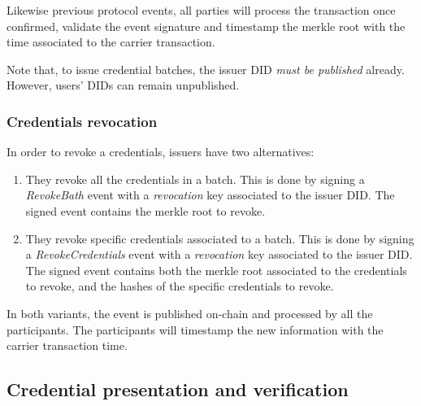 \documentclass[10pt,a4paper]{article}
\begin{document}
Likewise previous protocol events, all parties will process the transaction once confirmed, validate the event signature and timestamp the merkle root with the time associated to the carrier transaction.

Note that, to issue credential batches, the issuer DID \emph{must be published} already. However, users' DIDs can remain unpublished.

\subsubsection{Credentials revocation}

In order to revoke a credentials, issuers have two alternatives:
\begin{enumerate}
\item They revoke all the credentials in a batch.
      This is done by signing a \emph{RevokeBath} event with a \emph{revocation} key associated to the issuer DID.
      The signed event contains the merkle root to revoke.
\item They revoke specific credentials associated to a batch.
      This is done by signing a \emph{RevokeCredentials} event with a \emph{revocation} key associated to the issuer DID. 
      The signed event contains both the merkle root associated to the credentials to revoke, and the hashes of the specific credentials to revoke.
\end{enumerate}

In both variants, the event is published on-chain and processed by all the participants. The participants will timestamp the new information with the carrier transaction time.

\subsection{Credential presentation and verification}
\end{document}

